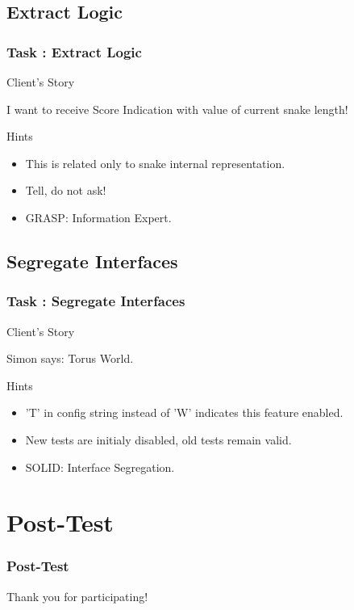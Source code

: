 \documentclass[english,handout]{beamer}
\newenvironment{narrowblock}[1]{%
\begin{center}
\begin{minipage}{10.5cm}
\begin{block}{#1}
}{%
\end{block}
\end{minipage}
\end{center}
}
\begin{document}
\subsection{Extract Logic}

\begin{frame}
\frametitle{Task \thesubsection: Extract Logic}

\begin{narrowblock}{Client's Story}
I want to receive Score Indication with value of current snake length!
\end{narrowblock}

\pause
\begin{narrowblock}{Hints}
\begin{itemize}[<+->]
\item This is related only to snake internal representation.
\item Tell, do not ask!
\item GRASP: Information Expert.
\end{itemize}
\end{narrowblock}
\end{frame}

\subsection{Segregate Interfaces}

\begin{frame}
\frametitle{Task \thesubsection: Segregate Interfaces}

\begin{narrowblock}{Client's Story}
Simon says: Torus World.
\end{narrowblock}

\pause
\begin{narrowblock}{Hints}
\begin{itemize}[<+->]
\item 'T' in config string instead of 'W' indicates this feature enabled.
\item New tests are initialy disabled, old tests remain valid.
\item SOLID: Interface Segregation.
\end{itemize}
\end{narrowblock}

\end{frame}

\section{Post-Test}
\begin{frame}
\frametitle{Post-Test}
\end{frame}

\begin{frame}
\begin{center}
Thank you for participating!
\end{center}
\end{frame}
\end{document}
